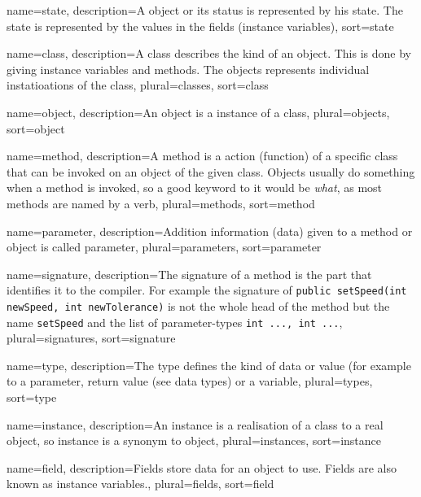 {
	name=state,
	description={A object or its status is represented by his state.
		The state is represented by the values in the fields
		(instance variables)},
	sort=state
}


{
	name=class,
	description={A class describes the kind of an object. This is done
		by giving instance variables and methods. The objects 
		represents individual instatioations of the class},
	plural=classes,
	sort=class
}

{
	name=object,
	description={An object is a instance of a class},
	plural=objects,
	sort=object
}

{
	name=method,
	description={A method is a action (function) of a specific class that
		can be invoked on an object of the given class. Objects usually
		do something when a method is invoked, so a good keyword to it
		would be \textit{what}, as most methods are named by a verb},
	plural=methods,
	sort=method
}

{
	name=parameter,
	description={Addition information (data) given to a method or object
		is called parameter},
	plural=parameters,
	sort=parameter
}

{
	name=signature,
	description={The signature of a method is the part that identifies 
		it to the compiler. For example the signature of 
		\lstinline{public setSpeed(int newSpeed, int newTolerance)}
		is not the whole head of the method but the name 
		\lstinline{setSpeed} and the list of parameter-types 
		\lstinline{int ..., int ...}},
	plural=signatures,
	sort=signature
}

{
	name=type,
	description={The type defines the kind of data or value (for example 
		to a parameter, return value (see data types) or a variable},
	plural=types,
	sort=type
}

{
	name=instance,
	description={An instance is a realisation of a class to a real object,
		so instance is a synonym to object},
	plural=instances,
	sort=instance
}

{
	name=field,
	description={Fields store data for an object to use. Fields are also
		known as instance variables.},
	plural=fields,
	sort=field
}

